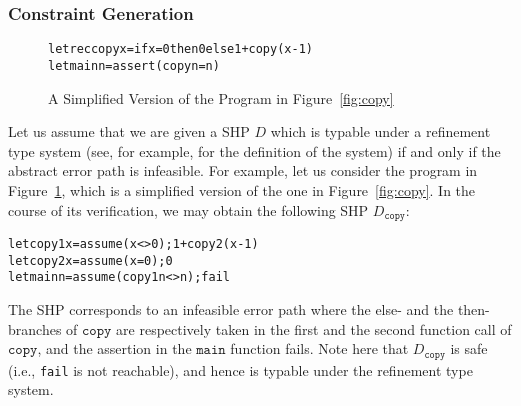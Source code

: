 \subsubsection{Constraint Generation}
\label{sec:cg}

\begin{figure}[t]
\begin{alltt}
letrec copy x = if x=0 then 0 else 1 + copy (x-1)
let main n = assert (copy n = n)
\end{alltt}
\caption{A Simplified Version of the Program in Figure~\ref{fig:copy}}
\label{fig:copy2}
\end{figure}

Let us assume that we are given a SHP \(D\) which is typable under a 
refinement type system (see, for example, \cite{Unno2009} for the 
definition of the system) if and only if the abstract error path is 
infeasible.  For example, let us consider the program in 
Figure~\ref{fig:copy2}, which is a simplified version of the one in 
Figure~\ref{fig:copy}.  In the course of its verification, we may obtain 
the following SHP \(D_{\texttt{copy}}\):
\begin{alltt}
 let copy1 x = assume (x<>0); 1 + copy2 (x-1)
 let copy2 x = assume (x=0); 0
 let main n = assume (copy1 n <> n); fail
\end{alltt}
The SHP corresponds to an infeasible error path where the else- and the 
then-branches of \(\texttt{copy}\) are respectively taken in the first 
and the second function call of \(\texttt{copy}\), and the assertion in 
the \(\texttt{main}\) function fails.  Note here that 
\(D_{\texttt{copy}}\) is safe (i.e., \texttt{fail} is not reachable), 
and hence is typable under the refinement type system.

